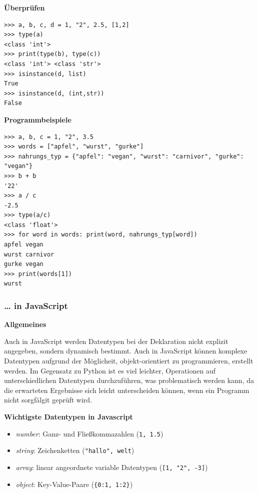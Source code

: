 \par\noindent\textbf{Überprüfen}

\begin{verbatim}
>>> a, b, c, d = 1, "2", 2.5, [1,2]
>>> type(a)
<class 'int'>
>>> print(type(b), type(c))
<class 'int'> <class 'str'>
>>> isinstance(d, list)
True
>>> isinstance(d, (int,str))
False
\end{verbatim}


\par\noindent\textbf{Programmbeispiele}

\begin{verbatim}
>>> a, b, c = 1, "2", 3.5
>>> words = ["apfel", "wurst", "gurke"]
>>> nahrungs_typ = {"apfel": "vegan", "wurst": "carnivor", "gurke": "vegan"}
>>> b + b
'22'
>>> a / c
-2.5
>>> type(a/c)
<class 'float'>
>>> for word in words: print(word, nahrungs_typ[word])
apfel vegan
wurst carnivor
gurke vegan
>>> print(words[1])
wurst
\end{verbatim}


\subsubsection{\texorpdfstring{{\ldots{} in
JavaScript}}{\ldots{} in JavaScript}}

\par\noindent\textbf{Allgemeines}

Auch in JavaScript werden Datentypen bei der Deklaration nicht explizit
angegeben, sondern dynamisch bestimmt. Auch in JavaScript können
komplexe Datentypen aufgrund der Möglicheit, objekt-orientiert zu
programmieren, erstellt werden. Im Gegensatz zu Python ist es viel
leichter, Operationen auf unterschiedlichen Datentypen durchzuführen,
was problematisch werden kann, da die erwarteten Ergebnisse sich leicht
unterscheiden können, wenn ein Programm nicht sorgfälgit geprüft wird.



\par\noindent\textbf{Wichtigste Datentypen in Javascript}

\begin{itemize}
\itemsep1pt\parskip0pt
\item
  {\emph{number}: Ganz- und Fließkommazahlen (\texttt{1,\ 1.5})}
\item
  {\emph{string}: Zeichenketten
  (\texttt{"hallo",\ \textquotesingle{}welt\textquotesingle{}})}
\item
  {\emph{array}: linear angeordnete variable Datentypen
  (\texttt{{[}1,\ "2",\ -3{]}})}
\item
  {\emph{object}: Key-Value-Paare (\texttt{\{0:1,\ 1:2\}})}
\end{itemize}

